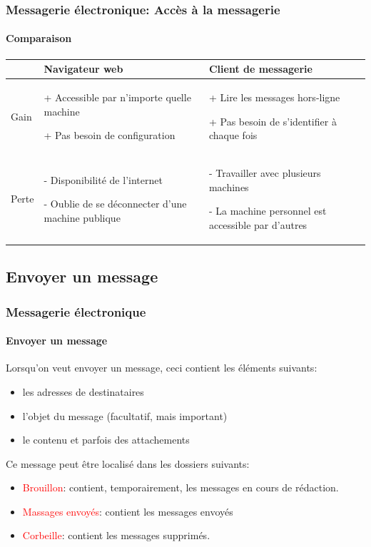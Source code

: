 \documentclass{beamer}
\begin{document}
\begin{frame}
\frametitle{Messagerie électronique: Accès à la messagerie}
\framesubtitle{Comparaison}

\begin{tabular}{p{}p{}p{}}
	\hline\hline
	& Navigateur web & Client de messagerie \\
	\hline\hline
	
	Gain &
	+ Accessible par n'importe quelle machine
	
	+ Pas besoin de configuration
	
	& 
	+ Lire les messages hors-ligne
	
	+ Pas besoin de s'identifier à chaque fois
	\\
	
	\hline
	Perte &
	- Disponibilité de l'internet
	
	- Oublie de se déconnecter d'une machine publique
	&
	- Travailler avec plusieurs machines
	
	- La machine personnel est accessible par d'autres
	\\
	\hline\hline
\end{tabular}

\end{frame}

\subsection{Envoyer un message}

\begin{frame}
\frametitle{Messagerie électronique}
\framesubtitle{Envoyer un message}

Lorsqu'on veut envoyer un message, ceci contient les éléments suivants: 
\begin{itemize}
	\item les adresses de destinataires 
	\item l'objet du message (facultatif, mais important)
	\item le contenu et parfois des attachements
\end{itemize}

Ce message peut être localisé dans les dossiers suivants:
\begin{itemize}
	\item \textcolor{red}{Brouillon}: contient, temporairement, les messages en cours de rédaction.
	\item \textcolor{red}{Massages envoyés}: contient les messages envoyés
	\item \textcolor{red}{Corbeille}: contient les messages supprimés.
\end{itemize}

\end{frame}
\end{document}
